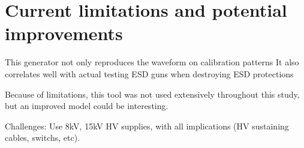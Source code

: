 \section{Current limitations and potential improvements}

This generator not only reproduces the waveform on calibration patterns
It also correlates well with actual testing ESD guns when destroying ESD protections

Because of limitations, this tool was not used extensively throughout this study, but an improved model could be interesting.

Challenges: Use 8kV, 15kV HV supplies, with all implications (HV sustaining cables, switchs, etc).
